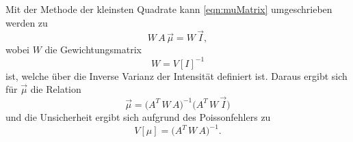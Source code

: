 Mit der Methode der kleinsten Quadrate kann \autoref{eqn:muMatrix} umgeschrieben werden zu
\begin{equation}
    W \,A \,\vec{\mu} = W \,\vec{I},
\end{equation}
wobei $W$ die Gewichtungsmatrix
\begin{equation}
    W = V[I]^{-1}
\end{equation}
ist, welche über die Inverse Varianz der Intensität definiert ist. Daraus ergibt sich für $\vec{\mu}$ die Relation
\begin{equation}
    \vec{\mu} = \biggl(A^T\, W \,A\biggr)^{-1} \biggl(A^T \,W \,\vec{I}\biggr)
    \label{eqn:mu_gleichung}
\end{equation}
und die Unsicherheit ergibt sich aufgrund des Poissonfehlers zu
\begin{equation}
    V[\mu] = \biggl(A^T\, W \,A\biggr)^{-1}.
    \label{eqn:Unsicherheit}
\end{equation}



